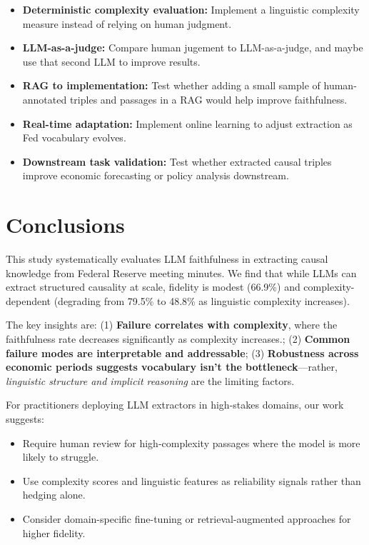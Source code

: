\documentclass[11pt]{article}
\begin{document}
\begin{itemize}
    \item \textbf{Deterministic complexity evaluation:} Implement a linguistic complexity measure instead of relying on human judgment.
    \item \textbf{LLM-as-a-judge:} Compare human jugement to LLM-as-a-judge, and maybe use that second LLM to improve results.
    \item \textbf{RAG to implementation:} Test whether adding a small sample of human-annotated triples and passages in a RAG would help improve faithfulness.
    \item \textbf{Real-time adaptation:} Implement online learning to adjust extraction as Fed vocabulary evolves.
    \item \textbf{Downstream task validation:} Test whether extracted causal triples improve economic forecasting or policy analysis downstream.
\end{itemize}

\section{Conclusions}

This study systematically evaluates LLM faithfulness in extracting causal knowledge from Federal Reserve meeting minutes. We find that while LLMs can extract structured causality at scale, fidelity is modest (66.9\%) and complexity-dependent (degrading from 79.5\% to 48.8\% as linguistic complexity increases). 

The key insights are: (1) \textbf{Failure correlates with complexity}, where the faithfulness rate decreases significantly as complexity increases.; (2) \textbf{Common failure modes are interpretable and addressable}; (3) \textbf{Robustness across economic periods suggests vocabulary isn't the bottleneck}—rather, \textit{linguistic structure and implicit reasoning} are the limiting factors.

For practitioners deploying LLM extractors in high-stakes domains, our work suggests:
\begin{itemize}
    \item Require human review for high-complexity passages where the model is more likely to struggle.
    \item Use complexity scores and linguistic features as reliability signals rather than hedging alone.
    \item Consider domain-specific fine-tuning or retrieval-augmented approaches for higher fidelity.
\end{itemize}
\end{document}
